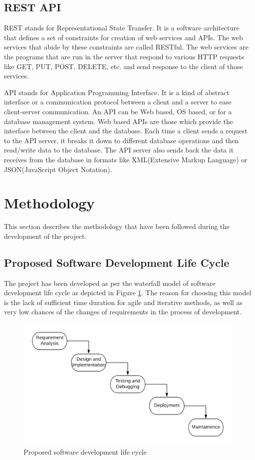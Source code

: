 \documentclass[12pt, a4paper, oneside]{article}
\begin{document}
\subsection{REST API}
REST stands for Representational State Transfer. It is a software architecture that defines a set of constraints for creation of web services and APIs. The web services that abide by these constraints are called RESTful. The web services are the programs that are run in the server that respond to various HTTP requests like GET, PUT, POST, DELETE, etc. and send response to the client of those services.

API stands for Application Programming Interface. It is a kind of abstract interface or a communication protocol between a client and a server to ease client-server communication. An API can be Web based, OS based, or for a database management system. Web based APIs are those which provide the interface between the client and the database. Each time a client sends a request to the API server, it breaks it down to different database operations and then read/write data to the database. The API server also sends back the data it receives from the database in formats like XML(Extensive Markup Language) or JSON(JavaScript Object Notation).

\break
\section{Methodology}
This section describes the methodology that have been followed during the development of the project.

\subsection{Proposed Software Development Life Cycle}
The project has been developed as per the waterfall model of software development life cycle as depicted in Figure \ref{fig:sdlc}. The reason for choosing this model is the lack of sufficient time duration for agile and iterative methods, as well as very low chances of the changes of requirements in the process of development. 

\begin{figure}[h]
	\includegraphics[width=\linewidth]{sdlc}
	\centering
	\caption{Proposed software development life cycle}
	\label{fig:sdlc}
\end{figure}
\end{document}

